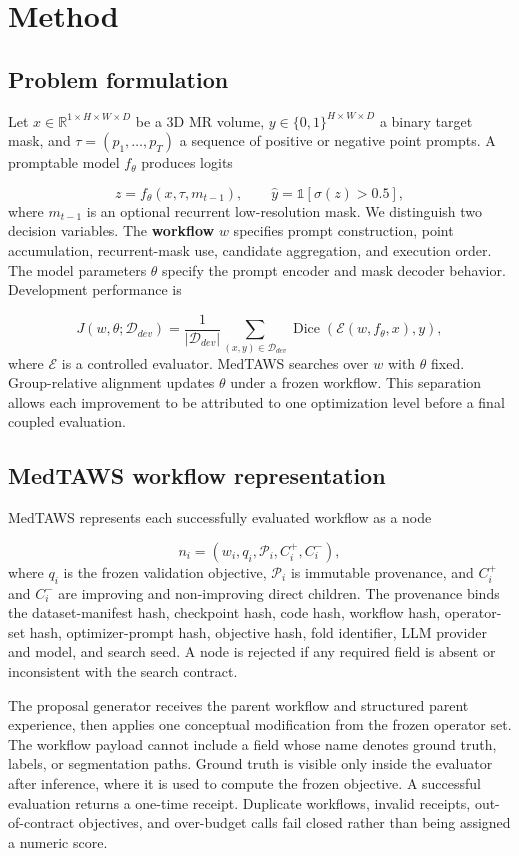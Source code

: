 \documentclass[10pt]{article}
\begin{document}
\section{Method}
\subsection{Problem formulation}
Let \(x\in\mathbb{R}^{1\times H\times W\times D}\) be a 3D MR volume, \(y\in\{0,1\}^{H\times W\times D}\) a binary target mask, and \(\tau=(p_1,\ldots,p_T)\) a sequence of positive or negative point prompts. A promptable model \(f_\theta\) produces logits

\[
z=f_\theta(x,\tau,m_{t-1}), \qquad \hat y=\mathbb{1}[\sigma(z)>0.5],
\]
where \(m_{t-1}\) is an optional recurrent low-resolution mask. We distinguish two decision variables. The \textbf{workflow} \(w\) specifies prompt construction, point accumulation, recurrent-mask use, candidate aggregation, and execution order. The model parameters \(\theta\) specify the prompt encoder and mask decoder behavior. Development performance is

\[
J(w,\theta;\mathcal D_{dev})=\frac{1}{|\mathcal D_{dev}|}
\sum_{(x,y)\in\mathcal D_{dev}}\operatorname{Dice}
\left(\mathcal E(w,f_\theta,x),y\right),
\]
where \(\mathcal E\) is a controlled evaluator. MedTAWS searches over \(w\) with \(\theta\) fixed. Group-relative alignment updates \(\theta\) under a frozen workflow. This separation allows each improvement to be attributed to one optimization level before a final coupled evaluation.

\subsection{MedTAWS workflow representation}
MedTAWS represents each successfully evaluated workflow as a node

\[
n_i=(w_i,q_i,\mathcal P_i,C_i^+,C_i^-),
\]
where \(q_i\) is the frozen validation objective, \(\mathcal P_i\) is immutable provenance, and \(C_i^+\) and \(C_i^-\) are improving and non-improving direct children. The provenance binds the dataset-manifest hash, checkpoint hash, code hash, workflow hash, operator-set hash, optimizer-prompt hash, objective hash, fold identifier, LLM provider and model, and search seed. A node is rejected if any required field is absent or inconsistent with the search contract.

The proposal generator receives the parent workflow and structured parent experience, then applies one conceptual modification from the frozen operator set. The workflow payload cannot include a field whose name denotes ground truth, labels, or segmentation paths. Ground truth is visible only inside the evaluator after inference, where it is used to compute the frozen objective. A successful evaluation returns a one-time receipt. Duplicate workflows, invalid receipts, out-of-contract objectives, and over-budget calls fail closed rather than being assigned a numeric score.
\end{document}
